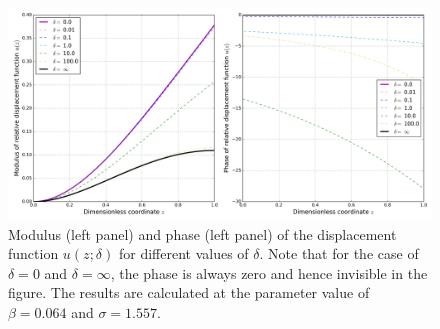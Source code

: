 \documentclass{svjour3}                     %
\begin{document}
\begin{figure}[!htbp]
    \centering
    \includegraphics[width=\textwidth]{./img_eig_asy/fig_sol_analytic_disp_fun.jpg}
    \caption{Modulus (left panel) and phase (left panel) of the displacement function $u(z;\delta)$ for different values of $\delta$. Note that for the case of $\delta = 0$ and $\delta = \infty$, the phase is always zero and hence invisible in the figure. The results are calculated at the parameter value of $\beta = 0.064$ and $\sigma = 1.557$.}
    \label{fig:fig_sol_analytic_disp_fun}
\end{figure}
\end{document}
